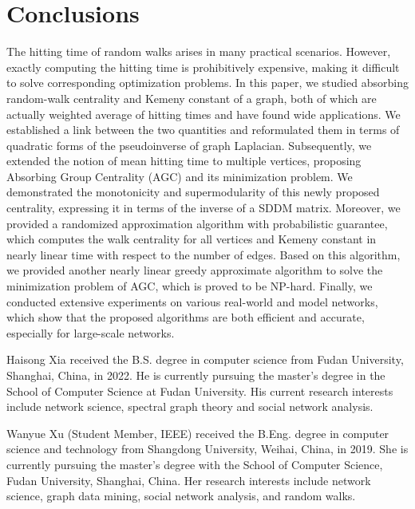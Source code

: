 \documentclass[10pt,journal,compsoc,twocolumn,twoside]{IEEEtran}
\newcommand{\biophoto}[1]{\texttt{[image: \#1]}}
\begin{document}
\section{Conclusions}

The hitting time of random walks arises in many practical scenarios.
However, exactly computing the hitting time is prohibitively expensive, making it difficult to solve corresponding optimization problems.
In this paper, we studied absorbing random-walk centrality and Kemeny constant of a graph, both of which are actually weighted average of hitting times and have found wide applications.
We established a link between the two quantities and reformulated them in terms of quadratic forms of the pseudoinverse of graph Laplacian.
Subsequently, we extended the notion of mean hitting time to multiple vertices, proposing Absorbing Group Centrality (AGC) and its minimization problem.
We demonstrated the monotonicity and supermodularity of this newly proposed centrality, expressing it in terms of the inverse of a SDDM matrix.
Moreover, we provided a randomized approximation algorithm with probabilistic guarantee, which computes the walk centrality for all vertices and Kemeny constant in nearly linear time with respect to the number of edges.
Based on this algorithm, we provided another nearly linear greedy approximate algorithm to solve the minimization problem of AGC, which is proved to be NP-hard.
Finally, we conducted extensive experiments on various real-world and model networks, which show that the proposed algorithms are both efficient and accurate, especially for large-scale networks.


\balance


\begin{IEEEbiography}[\biophoto{xhs.jpg}]{Haisong Xia}
    received the B.S. degree in computer science from Fudan University, Shanghai, China, in 2022. He is currently pursuing the master's degree in the School of Computer Science at Fudan University.
    His current research interests include network science, spectral graph theory and social network analysis.
\end{IEEEbiography}

\begin{IEEEbiography}{Wanyue Xu}
    (Student Member, IEEE) received the B.Eng. degree in computer science and technology from Shangdong University, Weihai, China, in 2019. She is currently pursuing the master's degree with the School of Computer Science, Fudan University, Shanghai, China.
    Her research interests include network science, graph data mining, social network analysis, and random walks.
\end{IEEEbiography}
\end{document}

